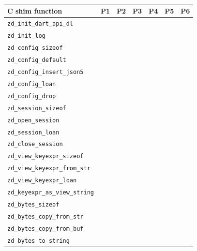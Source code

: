 \documentclass[11pt,a4paper]{article}
\newcommand{\fn}[1]{\texttt{#1}}
\newcommand{\yes}{\textbullet}
\newcommand{\no}{}
\begin{document}
{\small
\begin{longtable}{l Y{7mm} Y{7mm} Y{7mm} Y{7mm} Y{7mm} Y{7mm}}
  \toprule
  \textbf{C shim function} & \textbf{P1} & \textbf{P2} & \textbf{P3} & \textbf{P4} & \textbf{P5} & \textbf{P6} \\
  \midrule
  \endhead
  \bottomrule
  \endfoot
  \fn{zd\_init\_dart\_api\_dl}       & \no  & \no  & \no  & \no  & \yes & \no  \\
  \fn{zd\_init\_log}                 & \no  & \no  & \no  & \no  & \no  & \no  \\
  \fn{zd\_config\_sizeof}            & \no  & \no  & \no  & \yes & \no  & \no  \\
  \fn{zd\_config\_default}           & \no  & \no  & \yes & \no  & \no  & \no  \\
  \fn{zd\_config\_insert\_json5}     & \yes & \yes & \no  & \no  & \no  & \no  \\
  \fn{zd\_config\_loan}              & \no  & \yes & \no  & \no  & \no  & \yes \\
  \fn{zd\_config\_drop}              & \yes & \no  & \no  & \no  & \no  & \no  \\
  \fn{zd\_session\_sizeof}           & \no  & \no  & \no  & \yes & \no  & \no  \\
  \fn{zd\_open\_session}             & \yes & \no  & \yes & \no  & \no  & \no  \\
  \fn{zd\_session\_loan}             & \no  & \yes & \no  & \no  & \no  & \yes \\
  \fn{zd\_close\_session}            & \yes & \yes & \no  & \no  & \no  & \no  \\
  \fn{zd\_view\_keyexpr\_sizeof}     & \no  & \no  & \no  & \yes & \no  & \no  \\
  \fn{zd\_view\_keyexpr\_from\_str}  & \yes & \no  & \no  & \no  & \no  & \no  \\
  \fn{zd\_view\_keyexpr\_loan}       & \no  & \yes & \no  & \no  & \no  & \yes \\
  \fn{zd\_keyexpr\_as\_view\_string} & \yes & \no  & \no  & \no  & \no  & \no  \\
  \fn{zd\_bytes\_sizeof}             & \no  & \no  & \no  & \yes & \no  & \no  \\
  \fn{zd\_bytes\_copy\_from\_str}    & \yes & \no  & \no  & \no  & \no  & \no  \\
  \fn{zd\_bytes\_copy\_from\_buf}    & \yes & \no  & \no  & \no  & \no  & \no  \\
  \fn{zd\_bytes\_to\_string}         & \yes & \no  & \no  & \no  & \no  & \no  \\

\end{longtable}}
\end{document}
